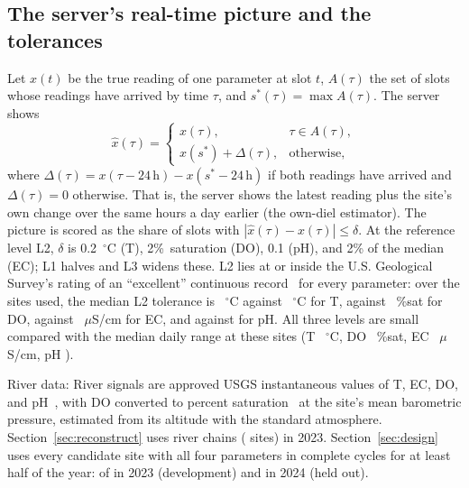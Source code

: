 \subsection{The server's real-time picture and the tolerances}
\label{sec:data-picture}
Let $x(t)$ be the true reading of one parameter at slot $t$, $A(\tau)$ the set of slots whose readings have arrived by time $\tau$, and $s^\ast(\tau)=\max A(\tau)$. The server shows
\begin{equation}
\hat{x}(\tau)=\begin{cases}
x(\tau), & \tau\in A(\tau),\\
x(s^\ast)+\Delta(\tau), & \text{otherwise},
\end{cases}
\label{eq:picture}
\end{equation}
where $\Delta(\tau)=x(\tau-24\,\mathrm{h})-x(s^\ast-24\,\mathrm{h})$ if both readings have arrived and $\Delta(\tau)=0$ otherwise. That is, the server shows the latest reading plus the site's own change over the same hours a day earlier (the own-diel estimator). The picture is scored as the share of slots with $|\hat{x}(\tau)-x(\tau)|\le\delta$. At the reference level L2, $\delta$ is 0.2~$^\circ$C (T), 2\%~saturation (DO), 0.1 (pH), and 2\% of the median (EC); L1 halves and L3 widens these. L2 lies at or inside the U.S. Geological Survey's rating of an ``excellent'' continuous record~\cite{wagner2006usgs} for every parameter: over the sites used, the median L2 tolerance is \tolTwoT~$^\circ$C against \usgsExcT~$^\circ$C for T, \tolTwoDO{} against \usgsExcDO~\%sat for DO, \tolTwoEC{} against \usgsExcEC~$\mu$S/cm for EC, and \tolTwoPh{} against \usgsExcPh{} for pH. All three levels are small compared with the median daily range at these sites (T \dayRangeT~$^\circ$C, DO \dayRangeDO~\%sat, EC \dayRangeEC~$\mu$S/cm, pH \dayRangePh).

River data: River signals are approved USGS instantaneous values of T, EC, DO, and pH~\cite{usgs2023nwis}, with DO converted to percent saturation~\cite{benson1984oxygen} at the site's mean barometric pressure, estimated from its altitude with the standard atmosphere. Section~\ref{sec:reconstruct} uses \chainCountWord{} river chains (\chainSites{} sites) in 2023. Section~\ref{sec:design} uses every candidate site with all four parameters in complete cycles for at least half of the year: \designSites{} of \designCandidates{} in 2023 (development) and \confSites{} in 2024 (held out).
